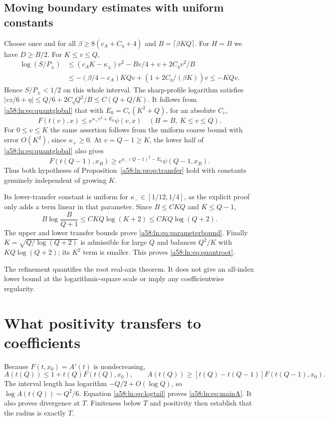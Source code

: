 \documentclass[11pt,letterpaper]{article}
\theoremstyle{remark}
\begin{document}
\subsection{Moving boundary estimates with uniform constants}
Choose once and for all
$\beta\ge8(c_A+C_\eta+4)$ and $B=\lceil\beta KQ\rceil$.
For $H=B$ we have $D\ge B/2$. For $K\le v\le Q$,
\begin{align*}
 \log(S/P_\pm)
 &\le(c_AK-\kappa_\pm)v^2-Bv/4+v+2C_\eta v^2/B\\
 &\le-(\beta/4-c_A)KQv+(1+2C_\eta/(\beta K))v
 \le-KQv.
\end{align*}
Hence $S/P_\pm<1/2$ on this whole interval. The sharp-profile logarithm
satisfies $|vz/6+\eta|\le Q/6+2C_\eta Q^2/B\le C(Q+Q/K)$.
It follows from \eqref{a58:ln:eq:quantglobal} that with
$E_0=C_e(K^2+Q)$, for an absolute $C_e$,
\[
 F(t(v),x)\le e^{\kappa_+v^2+E_0}\psi(v,x)
 \quad(H=B,\ K\le v\le Q).
\]
For $0\le v\le K$ the same assertion follows from the uniform coarse
bound with error $O(K^2)$, since $\kappa_+\ge0$.
At $v=Q-1\ge K$, the lower half of \eqref{a58:ln:eq:quantglobal} also gives
\[
 F(t(Q-1),x_B)\ge
 e^{\kappa_-(Q-1)^2-E_0}\psi(Q-1,x_B).
\]
Thus both hypotheses of Proposition~\ref{a58:ln:prop:transfer} hold with
constants genuinely independent of growing $K$.

Its lower-transfer constant is uniform for
$\kappa_-\in[1/12,1/4]$, as the explicit proof only adds a term linear
in that parameter. Since $B\le CKQ$ and $K\le Q-1$,
\[
 B\log\frac B{Q+1}\le CKQ\log(K+2)\le CKQ\log(Q+2).
\]
The upper and lower transfer bounds prove \eqref{a58:ln:eq:parameterbound}.
Finally $K=\sqrt{Q/\log(Q+2)}$ is admissible for large $Q$ and balances
$Q^2/K$ with $KQ\log(Q+2)$; its $K^2$ term is smaller.
This proves \eqref{a58:ln:eq:quantroot}.

The refinement quantifies the root real-axis theorem. It does not give
an all-index lower bound at the logarithmic-square scale or imply any
coefficientwise regularity.

\section{What positivity transfers to coefficients}\label{a58:ln:sec:coefficients}
Because $F(t,x_0)=A'(t)$ is nondecreasing,
\[
 A(t(Q))\le1+t(Q)F(t(Q),x_0),\qquad
 A(t(Q))\ge[t(Q)-t(Q-1)]F(t(Q-1),x_0).
\]
The interval length has logarithm $-Q/2+O(\log Q)$, so
$\log A(t(Q))\sim Q^2/6$. Equation \eqref{a58:ln:eq:logtail} proves
\eqref{a58:ln:eq:mainA}. It also proves divergence at $T$. Finiteness below
$T$ and positivity then establish that the radius is exactly $T$.
\end{document}
